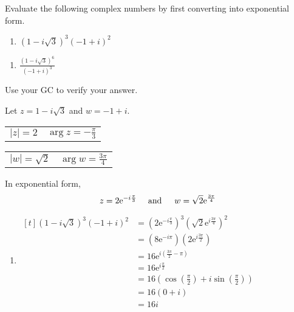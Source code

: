 \documentclass[11pt,a4paper]{book}
\begin{document}
\begin{example}

Evaluate the following complex numbers by first converting into exponential
form.

\begin{minipage}[t]{0.5\textwidth}

\begin{enumerate}[label=(\alph*)]

\item  $\left(1-i\sqrt{3}\right)^{3}\left(-1+i\right)^{2}$

\end{enumerate}

\end{minipage}
\begin{minipage}[t]{0.5\textwidth}

\begin{enumerate}[label=(\alph*),start=2]

\item  ${\displaystyle \frac{\left(1-i\sqrt{3}\right)^{6}}{\left(-1+i\right)^{3}}}$

\end{enumerate}

\end{minipage}

Use your GC to verify your answer.

\Solution

Let $z=1-i\sqrt{3}$ and $w=-1+i$.

\begin{tabular}{>{\raggedright}p{3cm}>{\raggedright}p{3cm}}
$\left|z\right|=2$ & ${\displaystyle \arg z=-\frac{\pi}{3}}$\tabularnewline
\end{tabular}

\begin{tabular}{>{\raggedright}p{3cm}>{\raggedright}p{3cm}}
$\left|w\right|=\sqrt{2}$ & ${\displaystyle \arg w=\frac{3\pi}{4}}$\tabularnewline
\end{tabular}

In exponential form,
\[
z=2\mathrm{e}^{-i\frac{\pi}{3}}\quad\text{ and \,}\quad w=\sqrt{2}\mathrm{e}^{\frac{3\pi}{4}}
\]

\begin{enumerate}[label=(\alph*)]

\item
$
\!
\begin{aligned}[t]
\left(1-i\sqrt{3}\right)^{3}\left(-1+i\right)^{2} & =\left(2\mathrm{e}^{-i\frac{\pi}{3}}\right)^{3}\left(\sqrt{2}\mathrm{e}^{i\frac{3\pi}{4}}\right)^{2}\\
 & =\left(8\mathrm{e}^{-i\pi}\right)\left(2\mathrm{e}^{i\frac{3\pi}{2}}\right)\\
 & =16\mathrm{e}^{i\left(\frac{3\pi}{2}-\pi\right)}\\
 & =16\mathrm{e}^{i\frac{\pi}{2}}\\
 & =16\left(\cos\left(\frac{\pi}{2}\right)+i\sin\left(\frac{\pi}{2}\right)\right)\\
 & =16\left(0+i\right)\\
 & =16i
\end{aligned}
$


\end{enumerate}
\end{example}
\end{document}
